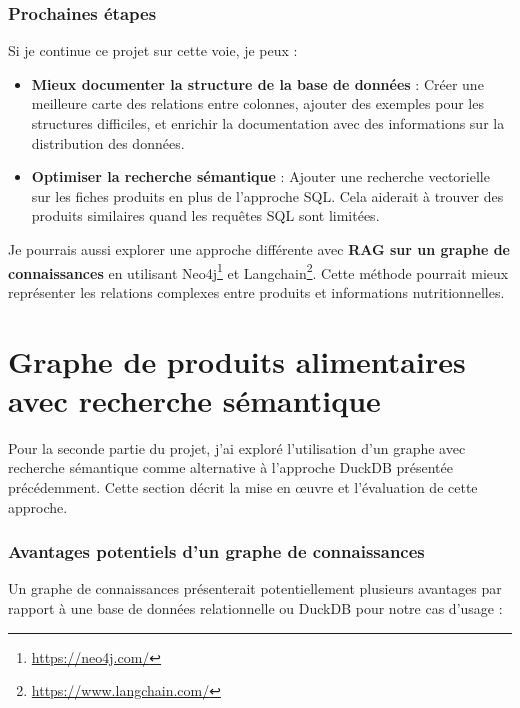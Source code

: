 \documentclass[a4paper,11pt]{article}
\begin{document}
\section{Prochaines étapes}
\label{sec:next}

Si je continue ce projet sur cette voie, je peux :
\begin{itemize}
\item \textbf{Mieux documenter la structure de la base de données} : Créer une meilleure carte des relations entre colonnes, ajouter des exemples pour les structures difficiles, et enrichir la documentation avec des informations sur la distribution des données.
\item \textbf{Optimiser la recherche sémantique} : Ajouter une recherche vectorielle sur les fiches produits en plus de l'approche SQL. Cela aiderait à trouver des produits similaires quand les requêtes SQL sont limitées.
\end{itemize}

\vskip 0.1cm
Je pourrais aussi explorer une approche différente avec \textbf{RAG sur un graphe de connaissances} en utilisant Neo4j\footnote{\url{https://neo4j.com/}} et 
Langchain\footnote{\url{https://www.langchain.com/}}. Cette méthode pourrait mieux représenter les relations complexes entre produits et informations nutritionnelles.






\part{Graphe de produits alimentaires avec recherche sémantique}
\label{part:graphe}

Pour la seconde partie du projet, j'ai exploré l'utilisation d'un graphe avec recherche sémantique comme alternative à l'approche DuckDB présentée précédemment. Cette section décrit la mise en œuvre et l'évaluation de cette approche.

\section{Avantages potentiels d'un graphe de connaissances}
\label{sec:avantages-graphe}

Un graphe de connaissances présenterait potentiellement plusieurs avantages par rapport à une base de données relationnelle ou DuckDB pour notre cas d'usage :
\end{document}
